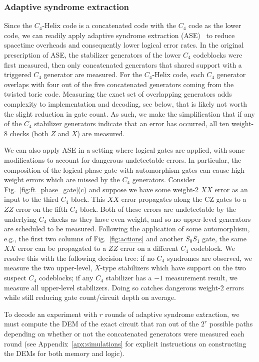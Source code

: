 \subsubsection{Adaptive syndrome extraction}
\label{section:ase}

Since the $C_4$-Helix code is a concatenated code with the $C_4$ code as the lower code, we can readily apply adaptive syndrome extraction (ASE)~\cite{Berthusen_2025} to reduce spacetime overheads and consequently lower logical error rates. In the original prescription of ASE, the stabilizer generators of the lower $C_4$ codeblocks were first measured, then only concatenated generators that shared support with a triggered $C_4$ generator are measured. For the $C_4$-Helix code, each $C_4$ generator overlaps with four out of the five concatenated generators coming from the twisted toric code. Measuring the exact set of overlapping generators adds complexity to implementation and decoding, see below, that is likely not worth the slight reduction in gate count. As such, we make the simplification that if any of the $C_4$ stabilizer generators indicate that an error has occurred, all ten weight-8 checks (both $Z$ and $X$) are measured. 

We can also apply ASE in a setting where logical gates are applied, with some modifications to account for dangerous undetectable errors. In particular, the composition of the logical phase gate with automorphism gates can cause high-weight errors which are missed by the $C_4$ generators. Consider Fig.~\ref{fig:ft_phase_gate}(c) and suppose we have some weight-2 $XX$ error as an input to the third $C_4$ block. This $XX$ error propagates along the CZ gates to a $ZZ$ error on the fifth $C_4$ block. Both of these errors are undetectable by the underlying $C_4$ checks as they have even weight, and so no upper-level generators are scheduled to be measured. Following the application of some automorphism, e.g., the first two columns of Fig.~\ref{fig:actions} and another $\overline{S}_0\overline{S}_1$ gate, the same $XX$ error can be propagated to a $ZZ$ error on a different $C_4$ codeblock. We resolve this with the following decision tree: if no $C_4$ syndromes are observed, we measure the two upper-level, $X$-type stabilizers which have support on the two suspect $C_4$ codeblocks; if any $C_4$ stabilizer has a $-1$ measurement result, we measure all upper-level stabilizers. Doing so catches dangerous weight-2 errors while still reducing gate count/circuit depth on average.

To decode an experiment with $r$ rounds of adaptive syndrome extraction, we must compute the DEM of the exact circuit that ran out of the $2^r$ possible paths depending on whether or not the concatenated generators were measured each round (see Appendix~\ref{apx:simulations} for explicit instructions on constructing the DEMs for both memory and logic).

